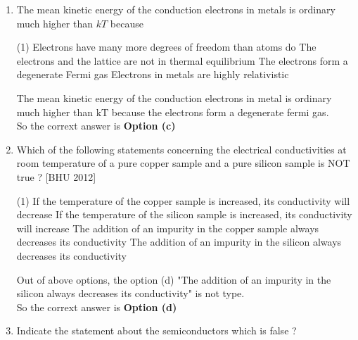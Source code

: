 \begin{enumerate}
\begin{answer}
$$\begin{aligned}
\begin{array}{c|ccc}
		A & B & C & y \\
		\hline 0 & 0 & 0 & 0 \\
		0 & 0 & 1 & 0 \\
		0 & 1 & 0 & 0 \\
		1 & 0 & 0 & 1
		\end{array}
	\end{aligned}
	$$
	Only option (d) will give such output.\\
		So the corrext answer is \textbf{Option (d)}
	\end{answer}
	\item The mean kinetic energy of the conduction electrons in metals is ordinary much higher than $k T$ because
	 \begin{tasks}(1)
		\task[\textbf{a.}]Electrons have many more degrees of freedom than atoms do
		\task[\textbf{b.}] The electrons and the lattice are not in thermal equilibrium
		\task[\textbf{c.}]The electrons form a degenerate Fermi gas
		\task[\textbf{d.}] Electrons in metals are highly relativistic
	\end{tasks}
\begin{answer}
	The mean kinetic energy of the conduction electrons in metal is ordinary much higher than $\mathrm{kT}$ because the electrons form a degenerate fermi gas.\\
		So the corrext answer is \textbf{Option (c)}
\end{answer}
\item Which of the following statements concerning the electrical conductivities at room temperature of a pure copper sample and a pure silicon sample is NOT true ?
	[BHU 2012]
	 \begin{tasks}(1)
		\task[\textbf{a.}]If the temperature of the copper sample is increased, its conductivity will decrease
		\task[\textbf{b.}]If the temperature of the silicon sample is increased, its conductivity will increase
		\task[\textbf{c.}] The addition of an impurity in the copper sample always decreases its conductivity
		\task[\textbf{d.}]  The addition of an impurity in the silicon always decreases its conductivity
	\end{tasks}
\begin{answer}
		Out of above options, the option (d) "The addition of an impurity in the silicon always decreases its conductivity" is not type.\\
	So the corrext answer is \textbf{Option (d)}
\end{answer}
\item Indicate the statement about the semiconductors which is false ?

\end{enumerate}
